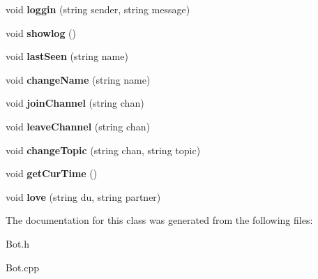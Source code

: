 \begin{DoxyCompactItemize}
\item 
\hypertarget{classprogramm_1_1Bot_a4449c3d1c1c9a952adf677f0c1070ac8}{void {\bfseries loggin} (string sender, string message)}\label{classprogramm_1_1Bot_a4449c3d1c1c9a952adf677f0c1070ac8}

\item 
\hypertarget{classprogramm_1_1Bot_a11bd611a94b44c790f434e1e79650e41}{void {\bfseries showlog} ()}\label{classprogramm_1_1Bot_a11bd611a94b44c790f434e1e79650e41}

\item 
\hypertarget{classprogramm_1_1Bot_ab9f54d0c625071366488fbbb2f36c61d}{void {\bfseries last\-Seen} (string name)}\label{classprogramm_1_1Bot_ab9f54d0c625071366488fbbb2f36c61d}

\item 
\hypertarget{classprogramm_1_1Bot_a4e700e7964f953fd65e44035ada62cb9}{void {\bfseries change\-Name} (string name)}\label{classprogramm_1_1Bot_a4e700e7964f953fd65e44035ada62cb9}

\item 
\hypertarget{classprogramm_1_1Bot_a4202f722a647486bc5debcdbeb83b776}{void {\bfseries join\-Channel} (string chan)}\label{classprogramm_1_1Bot_a4202f722a647486bc5debcdbeb83b776}

\item 
\hypertarget{classprogramm_1_1Bot_a16164b12dd20a67695900008f4f2ebfc}{void {\bfseries leave\-Channel} (string chan)}\label{classprogramm_1_1Bot_a16164b12dd20a67695900008f4f2ebfc}

\item 
\hypertarget{classprogramm_1_1Bot_aacde26c91b7407ab9560a3ff449b8442}{void {\bfseries change\-Topic} (string chan, string topic)}\label{classprogramm_1_1Bot_aacde26c91b7407ab9560a3ff449b8442}

\item 
\hypertarget{classprogramm_1_1Bot_ace25e68ac90b4245a8061fb42b2639be}{void {\bfseries get\-Cur\-Time} ()}\label{classprogramm_1_1Bot_ace25e68ac90b4245a8061fb42b2639be}

\item 
\hypertarget{classprogramm_1_1Bot_af1860c2394812fc56de33870b79e92f9}{void {\bfseries love} (string du, string partner)}\label{classprogramm_1_1Bot_af1860c2394812fc56de33870b79e92f9}

\end{DoxyCompactItemize}


\-The documentation for this class was generated from the following files\-:\begin{DoxyCompactItemize}
\item 
\-Bot.\-h\item 
\-Bot.\-cpp\end{DoxyCompactItemize}
